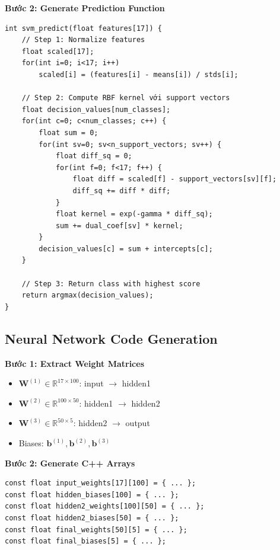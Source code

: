 \textbf{Bước 2: Generate Prediction Function}
\begin{verbatim}
int svm_predict(float features[17]) {
    // Step 1: Normalize features
    float scaled[17];
    for(int i=0; i<17; i++)
        scaled[i] = (features[i] - means[i]) / stds[i];
    
    // Step 2: Compute RBF kernel với support vectors
    float decision_values[num_classes];
    for(int c=0; c<num_classes; c++) {
        float sum = 0;
        for(int sv=0; sv<n_support_vectors; sv++) {
            float diff_sq = 0;
            for(int f=0; f<17; f++) {
                float diff = scaled[f] - support_vectors[sv][f];
                diff_sq += diff * diff;
            }
            float kernel = exp(-gamma * diff_sq);
            sum += dual_coef[sv] * kernel;
        }
        decision_values[c] = sum + intercepts[c];
    }
    
    // Step 3: Return class with highest score
    return argmax(decision_values);
}
\end{verbatim}

\subsection{Neural Network Code Generation}

\textbf{Bước 1: Extract Weight Matrices}
\begin{itemize}
    \item $\mathbf{W}^{(1)} \in \mathbb{R}^{17 \times 100}$: input $\rightarrow$ hidden1
    \item $\mathbf{W}^{(2)} \in \mathbb{R}^{100 \times 50}$: hidden1 $\rightarrow$ hidden2
    \item $\mathbf{W}^{(3)} \in \mathbb{R}^{50 \times 5}$: hidden2 $\rightarrow$ output
    \item Biases: $\mathbf{b}^{(1)}, \mathbf{b}^{(2)}, \mathbf{b}^{(3)}$
\end{itemize}

\textbf{Bước 2: Generate C++ Arrays}
\begin{verbatim}
const float input_weights[17][100] = { ... };
const float hidden_biases[100] = { ... };
const float hidden2_weights[100][50] = { ... };
const float hidden2_biases[50] = { ... };
const float final_weights[50][5] = { ... };
const float final_biases[5] = { ... };
\end{verbatim}

